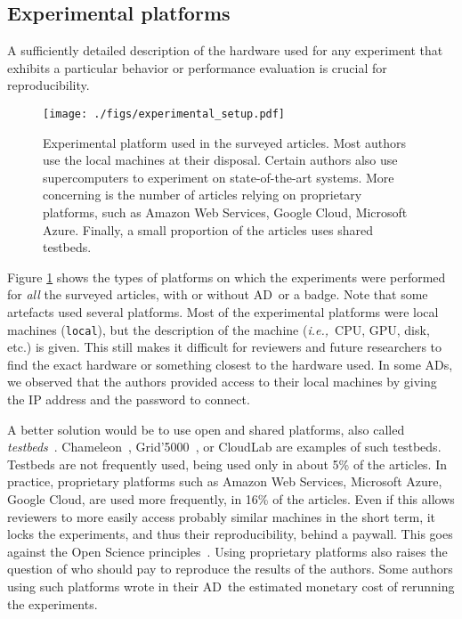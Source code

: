 \documentclass[sigconf,natbib=false]{acmart}
\newcommand{\ie}{\emph{i.e.,}}
\newcommand{\ad}{AD}
\begin{document}
\subsection{Experimental platforms}\label{sec:sop:expe}

A sufficiently detailed description of the hardware used for any experiment that exhibits a particular behavior or performance evaluation is crucial for reproducibility.

\begin{figure}
  \centering
  \texttt{[image: ./figs/experimental\_setup.pdf]}
  \caption{Experimental platform used in the surveyed articles.
  Most authors use the local machines at their disposal.
  Certain authors also use supercomputers to experiment on state-of-the-art systems.
  More concerning is the number of articles relying on proprietary platforms, such as Amazon Web Services, Google Cloud, Microsoft Azure.
  Finally, a small proportion of the articles uses shared testbeds.
  }
  \label{fig:experimental_setup}
\end{figure}

Figure \ref{fig:experimental_setup} shows the types of platforms on which the experiments were performed for \emph{all} the surveyed articles, with or without \ad\ or a badge.
Note that some artefacts used several platforms.
Most of the experimental platforms were local machines (\texttt{local}), but the description of the machine (\ie\ CPU, GPU, disk, etc.) is given.
This still makes it difficult for reviewers and future researchers to find the exact hardware or something closest to the hardware used.
In some \ad s, we observed that the authors provided access to their local machines by giving the IP address and the password to connect.

A better solution would be to use open and shared platforms, also called \emph{testbeds}\ \cite{nussbaum2017testbeds}.
Chameleon\ \cite{chameleon}, Grid'5000\ \cite{grid5000}, or CloudLab \cite{cloudlab} are examples of such testbeds.
Testbeds are not frequently used, being used only in about 5\% of the articles.
In practice, proprietary platforms such as Amazon Web Services, Microsoft Azure, Google Cloud, are used more frequently, in 16\% of the articles.
Even if this allows reviewers to more easily access probably similar machines in the short term, it locks the experiments, and thus their reproducibility, behind a paywall.
This goes against the Open Science principles\ \cite{openscience_unesco}.
Using proprietary platforms also raises the question of who should pay to reproduce the results of the authors.
Some authors using such platforms wrote in their \ad\ the estimated monetary cost of rerunning the experiments.
\end{document}

